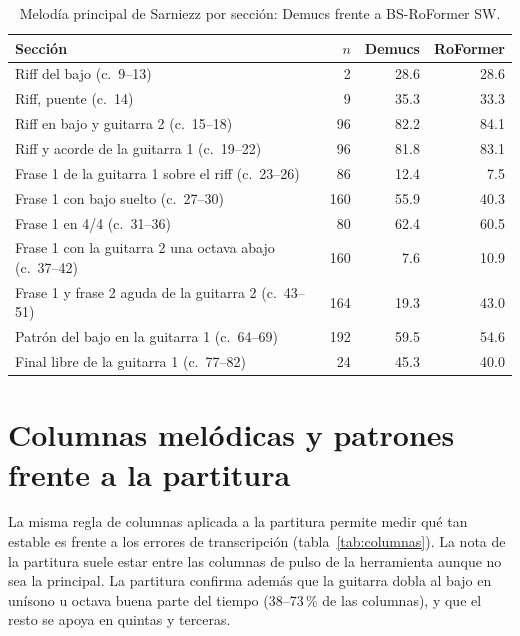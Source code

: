 \begin{table}[ht]
  \centering\small
  \caption{Melodía principal de Sarniezz por sección: Demucs frente a BS-RoFormer SW.}\label{tab:sep-seccion}
  \begin{tabular}{@{}lrrr@{}}
    \toprule
    Sección & $n$ & Demucs & RoFormer \\
    \midrule
    Riff del bajo (c.~9--13) & 2 & 28.6 & 28.6 \\
    Riff, puente (c.~14) & 9 & 35.3 & 33.3 \\
    Riff en bajo y guitarra 2 (c.~15--18) & 96 & 82.2 & 84.1 \\
    Riff y acorde de la guitarra 1 (c.~19--22) & 96 & 81.8 & 83.1 \\
    Frase 1 de la guitarra 1 sobre el riff (c.~23--26) & 86 & 12.4 & 7.5 \\
    Frase 1 con bajo suelto (c.~27--30) & 160 & 55.9 & 40.3 \\
    Frase 1 en 4/4 (c.~31--36) & 80 & 62.4 & 60.5 \\
    Frase 1 con la guitarra 2 una octava abajo (c.~37--42) & 160 & 7.6 & 10.9 \\
    Frase 1 y frase 2 aguda de la guitarra 2 (c.~43--51) & 164 & 19.3 & 43.0 \\
    Patrón del bajo en la guitarra 1 (c.~64--69) & 192 & 59.5 & 54.6 \\
    Final libre de la guitarra 1 (c.~77--82) & 24 & 45.3 & 40.0 \\
    \bottomrule
  \end{tabular}
\end{table}

\section{Columnas melódicas y patrones frente a la partitura}

La misma regla de columnas aplicada a la partitura permite medir qué tan estable es frente a los errores de transcripción
(tabla~\ref{tab:columnas}). La nota de la partitura suele estar entre las columnas de pulso de la herramienta aunque no sea
la principal. La partitura confirma además que la guitarra dobla al bajo en unísono u octava buena parte del tiempo
(38--73\,\% de las columnas), y que el resto se apoya en quintas y terceras.

